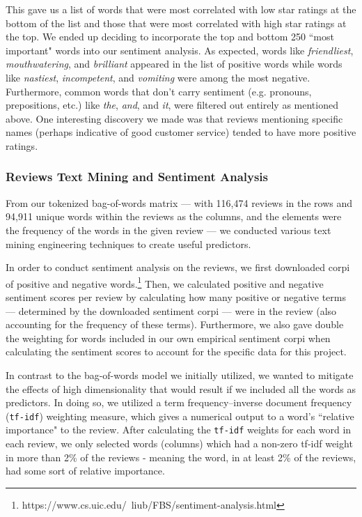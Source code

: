 \documentclass[10pt]{article}
\begin{document}
This gave us a list of words that were most correlated with low star ratings at the bottom of the list and those that were most correlated with high star ratings at the top. We ended up deciding to incorporate the top and bottom 250 ``most important" words into our sentiment analysis. As expected, words like \textit{friendliest}, \textit{mouthwatering}, and \textit{brilliant} appeared in the list of positive words while words like \textit{nastiest}, \textit{incompetent}, and \textit{vomiting} were among the most negative. Furthermore, common words that don't carry sentiment (e.g. pronouns, prepositions, etc.) like \textit{the}, \textit{and}, and \textit{it}, were filtered out entirely as mentioned above. One interesting discovery we made was that reviews mentioning specific names (perhaps indicative of good customer service) tended to have more positive ratings.  

\subsubsection{Reviews Text Mining and Sentiment Analysis}

From our tokenized bag-of-words matrix --- with 116,474 reviews in the rows and 94,911 unique words within the reviews as the columns, and the elements were the frequency of the words in the given review --- we conducted various text mining engineering techniques to create useful predictors.

\vspace{0.1in}

\noindent
In order to conduct sentiment analysis on the reviews, we first downloaded corpi of positive and negative words.\footnote{https://www.cs.uic.edu/~liub/FBS/sentiment-analysis.html} Then, we calculated positive and negative sentiment scores per review by calculating how many positive or negative terms --- determined by the downloaded sentiment corpi --- were in the review (also accounting for the frequency of these terms). Furthermore, we also gave double the weighting for words included in our own empirical sentiment corpi when calculating the sentiment scores to account for the specific data for this project.
\vspace{0.1in}

\noindent
In contrast to the bag-of-words model we initially utilized, we wanted to mitigate the effects of high dimensionality that would result if we included all the words as predictors. In doing so, we utilized a term frequency–inverse document frequency (\texttt{tf-idf}) weighting measure, which gives a numerical output to a word's ``relative importance" to the review. After calculating the \texttt{tf-idf} weights for each word in each review, we only selected words (columns) which had a non-zero tf-idf weight in more than 2\% of the reviews - meaning the word, in at least 2\% of the reviews, had some sort of relative importance.
\vspace{0.1in}
\end{document}
